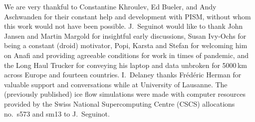\documentclass[esurf, manuscript]{copernicus}
\begin{document}



\begin{acknowledgements}
    We are very thankful to Constantine Khroulev, Ed Bueler, and Andy
    Aschwanden for their constant help and development with PISM, without whom
    this work would not have been possible. J.~Seguinot would like to thank
    John Jansen and Martin Margold for insightful early discussions, Susan
    Ivy-Ochs for being a constant (droid) motivator, Popi, Karsta and Stefan
    for welcoming him on Anafi and providing agreeable conditions for work in
    times of pandemic, and the Long Haul Trucker for conveying his laptop and
    data unbroken for 5000\,km across Europe and fourteen countries.
    I.~Delaney thanks Fr\'ed\'eric Herman for valuable support and
    conversations while at University of Lausanne.
    The (previously published) ice flow simulations were made with computer
    resources provided by the Swiss National Supercomputing Centre (CSCS)
    allocations no.~s573 and sm13 to J.~Seguinot.
\end{acknowledgements}







\end{document}

